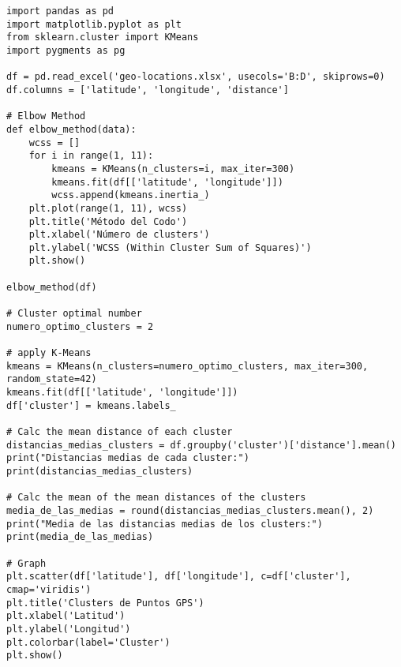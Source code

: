 \begin{verbatim}
import pandas as pd
import matplotlib.pyplot as plt
from sklearn.cluster import KMeans
import pygments as pg

df = pd.read_excel('geo-locations.xlsx', usecols='B:D', skiprows=0)
df.columns = ['latitude', 'longitude', 'distance']

# Elbow Method
def elbow_method(data):
    wcss = []
    for i in range(1, 11):
        kmeans = KMeans(n_clusters=i, max_iter=300)
        kmeans.fit(df[['latitude', 'longitude']])
        wcss.append(kmeans.inertia_)
    plt.plot(range(1, 11), wcss)
    plt.title('Método del Codo')
    plt.xlabel('Número de clusters')
    plt.ylabel('WCSS (Within Cluster Sum of Squares)')
    plt.show()

elbow_method(df)

# Cluster optimal number
numero_optimo_clusters = 2

# apply K-Means
kmeans = KMeans(n_clusters=numero_optimo_clusters, max_iter=300, random_state=42)
kmeans.fit(df[['latitude', 'longitude']])
df['cluster'] = kmeans.labels_

# Calc the mean distance of each cluster
distancias_medias_clusters = df.groupby('cluster')['distance'].mean()
print("Distancias medias de cada cluster:")
print(distancias_medias_clusters)

# Calc the mean of the mean distances of the clusters
media_de_las_medias = round(distancias_medias_clusters.mean(), 2)
print("Media de las distancias medias de los clusters:")
print(media_de_las_medias)

# Graph
plt.scatter(df['latitude'], df['longitude'], c=df['cluster'], cmap='viridis')
plt.title('Clusters de Puntos GPS')
plt.xlabel('Latitud')
plt.ylabel('Longitud')
plt.colorbar(label='Cluster')
plt.show()

\end{verbatim}

